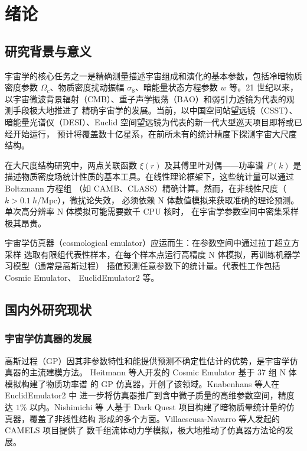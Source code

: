 \chapter{绪论}\label{chap:intro}

\section{研究背景与意义}\label{sec:bg}

宇宙学的核心任务之一是精确测量描述宇宙组成和演化的基本参数，包括冷暗物质密度参数
$\Omega_c$、物质密度扰动振幅 $\sigma_8$、暗能量状态方程参数 $w$ 等。21 世纪以来，
以宇宙微波背景辐射（CMB）、重子声学振荡（BAO）和弱引力透镜为代表的观测手段极大地推进了
精确宇宙学的发展\cite{Planck2020,Riess1998}。当前，以中国空间站望远镜（CSST）\cite{Zhan2011}、
暗能量光谱仪（DESI）、Euclid 空间望远镜为代表的新一代大型巡天项目即将或已经开始运行，
预计将覆盖数十亿星系，在前所未有的统计精度下探测宇宙大尺度结构。

在大尺度结构研究中，两点关联函数 $\xi(r)$ 及其傅里叶对偶——功率谱 $P(k)$
是描述物质密度场统计性质的基本工具。在线性理论框架下，这些统计量可以通过 Boltzmann 方程组
（如 CAMB、CLASS）精确计算。然而，在非线性尺度（$k>0.1~h/\mathrm{Mpc}$），微扰论失效，
必须依赖 N 体数值模拟来获取准确的理论预测。单次高分辨率 N 体模拟可能需要数千 CPU 核时，
在宇宙学参数空间中密集采样极其昂贵。

宇宙学仿真器（cosmological emulator）应运而生：在参数空间中通过拉丁超立方采样\cite{McKay1979}
选取有限组代表性样本，在每个样本点运行高精度 N 体模拟，再训练机器学习模型（通常是高斯过程）
插值预测任意参数下的统计量。代表性工作包括 Cosmic Emulator\cite{Heitmann2009}、
EuclidEmulator2\cite{Knabenhans2019} 等。

\section{国内外研究现状}\label{sec:related}

\subsection{宇宙学仿真器的发展}

高斯过程（GP）因其非参数特性和能提供预测不确定性估计的优势，是宇宙学仿真器的主流建模方法。
Heitmann 等人\cite{Heitmann2009}开发的 Cosmic Emulator 基于 37 组 N 体模拟构建了物质功率谱
的 GP 仿真器，开创了该领域。Knabenhans 等人\cite{Knabenhans2019}在 EuclidEmulator2 中
进一步将仿真器推广到含中微子质量的高维参数空间，精度达 $1\%$ 以内。Nishimichi 等
人\cite{Nishimichi2019}基于 Dark Quest 项目构建了暗物质晕统计量的仿真器，覆盖了非线性结构
形成的多个方面。Villaescusa-Navarro 等人\cite{Villaescusa2021}发起的 CAMELS 项目提供了
数千组流体动力学模拟，极大地推动了仿真器方法论的发展。


